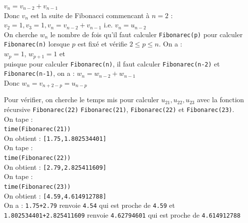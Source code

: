 \documentclass[a4paper,11pt]{book}
\begin{document}
$v_n=v_{n-2}+v_{n-1}$\\ 
Donc $v_n$ est la suite de Fibonacci commencant \`a $n=2$ :\\
$v_2=1,v_3=1,v_n=v_{n-2}+v_{n-1}$ i.e. $v_n=u_{n-2}$\\
On cherche  $w_n$ le nombre de fois qu'il faut 
calculer {\tt Fibonarec(p)} pour calculer {\tt Fibonarec(n)} lorsque $p$ est fix\'e et 
v\'erifie $2\leq p\leq n$.
On a :\\
$w_p=1$, $w_{p+1}=1$ et\\
puisque pour calculer {\tt Fibonarec(n)}, il faut calculer {\tt Fibonarec(n-2)} et 
{\tt Fibonarec(n-1)}, on a : $w_n=w_{n-2}+w_{n-1}$ \\
Donc $w_n=v_{n+2-p}=u_{n-p}$ 

Pour v\'erifier, on cherche le temps mis pour calculer  $u_{21},u_{22},u_{23}$
avec la fonction r\'ecursive {\tt Fibonarec(22)}
{\tt Fibonarec(21)}, {\tt Fibonarec(22)} et {\tt Fibonarec(23)}.\\
On tape  :\\
{\tt time(Fibonarec(21))}\\
On obtient : {\tt [1.75,1.802534401]}\\
On tape  :\\
{\tt time(Fibonarec(22))}\\
On obtient : {\tt [2.79,2.825411609]}\\
On tape  :\\
{\tt time(Fibonarec(23))}\\
On obtient : {\tt [4.59,4.614912788]}\\
On a : {\tt 1.75+2.79} renvoie {\tt 4.54} qui est proche de {\tt 4.59}
et {\tt 1.802534401+2.825411609} renvoie {\tt 4.62794601} qui est proche de 
{\tt 4.614912788}\\
\end{document}
